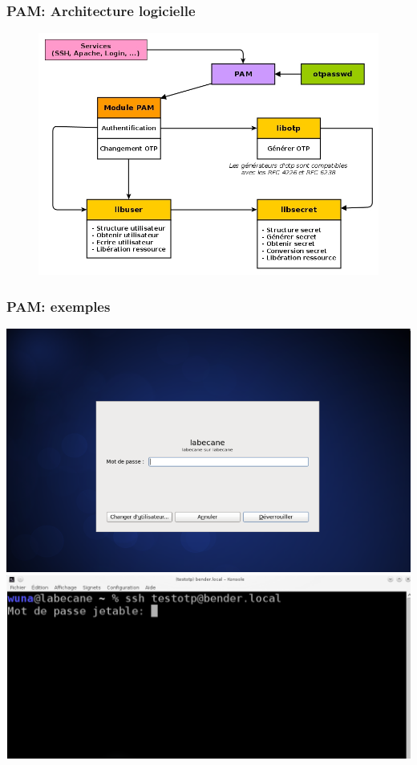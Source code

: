 \documentclass[xcolor=table]{beamer}
\begin{document}
\begin{frame}
\frametitle{PAM: Architecture logicielle}
\begin{figure}
 \includegraphics[scale=0.38]{../graphics/architecturepammodule.jpg} 
 
\end{figure}
\end{frame}

\begin{frame}
\frametitle{PAM: exemples}
\includegraphics[scale=0.19]{../graphics/loginmanager.png}
\hspace{0.8em}
\includegraphics[scale=0.23]{../graphics/ssh.png}
\end{frame}
\end{document}
